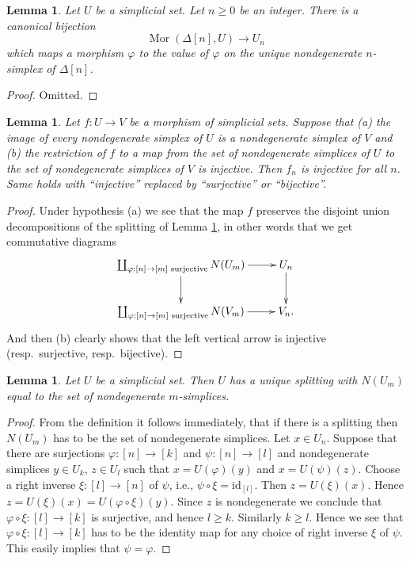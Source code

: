 \documentclass{stacks-project}
\theoremstyle{plain}
\newtheorem{lemma}[subsection]{Lemma}
\theoremstyle{definition}
\theoremstyle{remark}
\numberwithin{equation}{subsection}
\def\Mor{\mathop{\mathrm{Mor}}\nolimits}
\begin{document}
\begin{lemma}
\label{lemma-simplex-map}
Let $U$ be a simplicial set. Let $n \geq 0$ be an integer.
There is a canonical bijection
$$
\Mor(\Delta[n], U)
\longrightarrow
U_n
$$
which maps a morphism $\varphi$ to the value of $\varphi$
on the unique nondegenerate $n$-simplex of $\Delta[n]$.
\end{lemma}

\begin{proof}
Omitted.
\end{proof}

\begin{lemma}
\label{lemma-injective-map-simplicial-sets}
Let $f : U \to V$ be a morphism of simplicial sets.
Suppose that (a) the image of every nondegenerate simplex of
$U$ is a nondegenerate simplex of $V$ and (b) the restriction
of $f$ to a map from the set of nondegenerate simplices of $U$
to the set of nondegenerate simplices of $V$ is injective.
Then $f_n$ is injective for all $n$.
Same holds with ``injective'' replaced by
``surjective'' or ``bijective''.
\end{lemma}

\begin{proof}
Under hypothesis (a) we see that the map $f$ preserves
the disjoint union decompositions of the splitting
of Lemma \ref{lemma-splitting-simplicial-sets}, in other words
that we get commutative diagrams
$$
\xymatrix{
\coprod\nolimits_{\varphi : [n] \to [m]\text{ surjective}}
N(U_m)
\ar[r] \ar[d] &
U_n \ar[d] \\
\coprod\nolimits_{\varphi : [n] \to [m]\text{ surjective}}
N(V_m)
\ar[r] &
V_n.
}
$$
And then (b) clearly shows that the left vertical arrow is
injective (resp.\ surjective, resp.\ bijective).
\end{proof}

\begin{lemma}
\label{lemma-splitting-simplicial-sets}
Let $U$ be a simplicial set. Then $U$ has a unique splitting
with $N(U_m)$ equal to the set of nondegenerate $m$-simplices.
\end{lemma}

\begin{proof}
From the definition it follows immediately, that if there is a
splitting then $N(U_m)$ has to be the set of nondegenerate simplices.
Let $x \in U_n$. Suppose that there are surjections $\varphi : [n] \to [k]$
and $\psi : [n] \to [l]$ and nondegenerate simplices
$y \in U_k$, $z \in U_l$ such that $x = U(\varphi)(y)$
and $x = U(\psi)(z)$. Choose a right inverse $\xi : [l] \to [n]$
of $\psi$, i.e., $\psi \circ \xi = \text{id}_{[l]}$.
Then $z = U(\xi)(x)$. Hence $z = U(\xi)(x) = U(\varphi \circ \xi)(y)$.
Since $z$ is nondegenerate we conclude that $\varphi \circ \xi :
[l] \to [k]$ is surjective, and hence $l \geq k$. Similarly
$k \geq l$. Hence we see that $\varphi \circ \xi : [l] \to [k]$
has to be the identity map for any choice of right inverse
$\xi$ of $\psi$. This easily implies that $\psi = \varphi$.
\end{proof}
\end{document}
